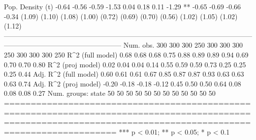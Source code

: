 Pop. Density (t)           -0.64      -0.56      -0.59      -1.53        0.04       0.18        0.11       -1.29 **    -0.65     -0.69     -0.66      -0.34    
                           (1.09)     (1.10)     (1.08)     (1.00)      (0.72)     (0.69)      (0.70)      (0.56)      (1.02)    (1.05)    (1.02)     (1.12)   
---------------------------------------------------------------------------------------------------------------------------------------------------------------
Num. obs.                 300        300        300        250         300        300         300         250         300       300       300        250       
R^2 (full model)            0.68       0.68       0.68       0.75        0.88       0.89        0.89        0.94        0.69      0.70      0.70       0.80    
R^2 (proj model)            0.02       0.04       0.04       0.14        0.55       0.59        0.59        0.73        0.25      0.25      0.25       0.44    
Adj. R^2 (full model)       0.60       0.61       0.61       0.67        0.85       0.87        0.87        0.93        0.63      0.63      0.63       0.74    
Adj. R^2 (proj model)      -0.20      -0.18      -0.18      -0.12        0.45       0.50        0.50        0.64        0.08      0.08      0.08       0.27    
Num. groups: state         50         50         50         50          50         50          50          50          50        50        50         50       
===============================================================================================================================================================
*** p < 0.01; ** p < 0.05; * p < 0.1

